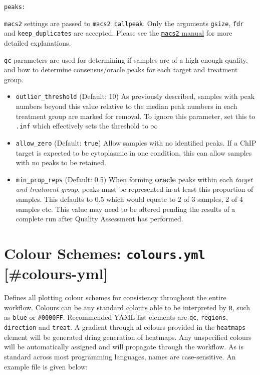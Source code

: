 \documentclass[
]{book}
\providecommand{\tightlist}{%
  \setlength{\itemsep}{0pt}\setlength{\parskip}{0pt}}
\begin{document}
\texttt{peaks:}

\texttt{macs2} settings are passed to \texttt{macs2\ callpeak}. Only the arguments \texttt{gsize}, \texttt{fdr} and \texttt{keep\_duplicates} are accepted.
Please see the \href{https://macs3-project.github.io/MACS/}{\texttt{macs2} manual} for more detailed explanations.

\texttt{qc} parameters are used for determining if samples are of a high enough quality, and how to determine consensus/oracle peaks for each target and treatment group.

\begin{itemize}
\tightlist
\item
  \texttt{outlier\_threshold} (Default: 10) As previously described, samples with peak numbers beyond this value relative to the median peak numbers in each treatment group are marked for removal. To ignore this parameter, set this to \texttt{.inf} which effectively sets the threshold to \(\infty\)
\item
  \texttt{allow\_zero} (Default: \texttt{true}) Allow samples with no identified peaks. If a ChIP target is expected to be cytoplasmic in one condition, this can allow samples with no peaks to be retained.
\item
  \texttt{min\_prop\_reps} (Default: 0.5) When forming \textbf{oracle} peaks within each \emph{target and treatment group}, peaks must be represented in at least this proportion of samples. This defaults to 0.5 which would equate to 2 of 3 samples, 2 of 4 samples etc. This value may need to be altered pending the results of a complete run after Quality Assessment has performed.
\end{itemize}

\hypertarget{colour-schemes-colours.yml-colours-yml}{%
\section{\texorpdfstring{Colour Schemes: \texttt{colours.yml} {[}\#colours-yml{]}}{Colour Schemes: colours.yml {[}\#colours-yml{]}}}\label{colour-schemes-colours.yml-colours-yml}}

Defines all plotting colour schemes for consistency throughout the entire workflow.
Colours can be any standard colours able to be interpreted by \texttt{R}, such as \texttt{\textquotesingle{}blue\textquotesingle{}} or \texttt{\textquotesingle{}\#0000FF\textquotesingle{}}.
Recommended YAML list elements are \texttt{qc}, \texttt{regions}, \texttt{direction} and \texttt{treat}.
A gradient through al colours provided in the \texttt{heatmaps} element will be generated dring generation of heatmaps.
Any unspecified colours will be automatically assigned and will propagate through the workflow.
As is standard across most programming languages, names are case-sensitive.
An example file is given below:
\end{document}

